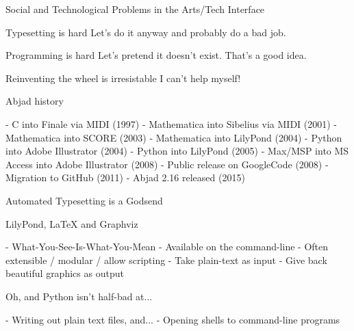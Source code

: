 \begin{frame}[fragile]{Social and Technological Problems in the Arts/Tech Interface}
\begin{block}{Typesetting is hard}
Let's do it anyway and probably do a bad job.
\end{block}
\begin{block}{Programming is hard}
Let's pretend it doesn't exist. That's a good idea.
\end{block}
\begin{block}{Reinventing the wheel is irresistable}
I can't help myself!
\end{block}
\end{frame}

\begin{frame}[fragile]{Abjad history}
\begin{markdown}
- C into Finale via MIDI (1997)
- Mathematica into Sibelius via MIDI (2001)
- Mathematica into SCORE (2003)
- Mathematica into LilyPond (2004)
- Python into Adobe Illustrator (2004)
- Python into LilyPond (2005)
- Max/MSP into MS Access into Adobe Illustrator (2008)
- Public release on GoogleCode (2008)
- Migration to GitHub (2011)
- Abjad 2.16 released (2015)
\end{markdown}
\end{frame}


\begin{frame}[fragile]{Automated Typesetting is a Godsend}
\begin{markdown}
LilyPond, LaTeX and Graphviz

- What-You-See-Is-What-You-Mean
- Available on the command-line
- Often extensible / modular / allow scripting
- Take plain-text as input
- Give back beautiful graphics as output

Oh, and Python isn't half-bad at...

- Writing out plain text files, and...
- Opening shells to command-line programs
\end{markdown}
\end{frame}